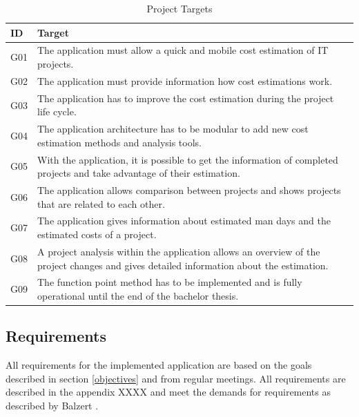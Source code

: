 \begin{table}[h]
	\centering 
	\setlength{\tabcolsep}{4pt}
	\begin{tabular}{|l||p{14cm}|}\hline
		ID		& Target\\ \hline\hline
		G01  	& The application must allow a quick and mobile cost estimation of IT projects.\\ \hline
		G02  	& The application must provide information how cost estimations work.\\ \hline
		G03  	& The application has to improve the cost estimation during  the project life cycle.\\ \hline
		G04  	& The application architecture has to be modular to add new cost estimation methods and analysis tools.\\ \hline
		G05  	& With the application, it is possible to get the information of completed projects and take advantage of their estimation.\\ \hline
		G06  	& The application allows comparison between projects and shows projects that are related to each other.\\ \hline
		G07  	& The application gives information about estimated man days and the estimated costs of a project.\\ \hline
		G08  	& A project analysis within the application allows an overview of the project changes and gives detailed information about the estimation.\\ \hline
		G09  	& The function point method has to be implemented and is fully operational until the end of the bachelor thesis.\\ \hline
	\end{tabular} 
	\caption{Project Targets} 
	\label{projecttargets} 
\end{table}

\subsection{Requirements}\label{requirements}

All requirements for the implemented application are based on the goals described in section \ref{objectives} and from regular meetings. All requirements are described in the appendix XXXX and meet the demands for requirements as described by Balzert \cite{basiskonzepteRE}.\\


